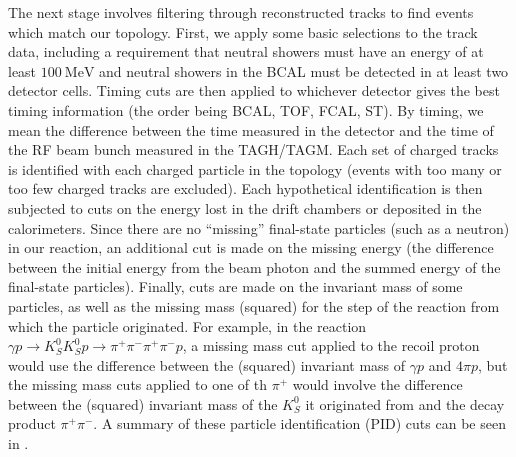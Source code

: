 The next stage involves filtering through reconstructed tracks to find events which match our topology. First, we apply some basic selections to the track data, including a requirement that neutral showers must have an energy of at least $\SI{100}{\mega\eV}$ and neutral showers in the BCAL must be detected in at least two detector cells. Timing cuts are then applied to whichever detector gives the best timing information (the order being BCAL, TOF, FCAL, ST). By timing, we mean the difference between the time measured in the detector and the time of the RF beam bunch measured in the TAGH/TAGM. Each set of charged tracks is identified with each charged particle in the topology (events with too many or too few charged tracks are excluded). Each hypothetical identification is then subjected to cuts on the energy lost in the drift chambers or deposited in the calorimeters. Since there are no ``missing'' final-state particles (such as a neutron) in our reaction, an additional cut is made on the missing energy (the difference between the initial energy from the beam photon and the summed energy of the final-state particles). Finally, cuts are made on the invariant mass of some particles, as well as the missing mass (squared) for the step of the reaction from which the particle originated. For example, in the reaction $\gamma p \to K_S^0 K_S^0 p \to \pi^+\pi^-\pi^+\pi^- p$, a missing mass cut applied to the recoil proton would use the difference between the (squared) invariant mass of $\gamma p$ and $4\pi p$, but the missing mass cuts applied to one of th $\pi^+$ would involve the difference between the (squared) invariant mass of the $K_S^0$ it originated from and the decay product $\pi^+\pi^-$. A summary of these particle identification (PID) cuts can be seen in .

